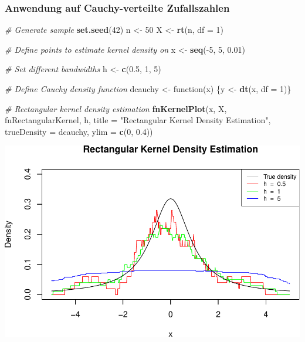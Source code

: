 \documentclass[10pt,]{article}
\newenvironment{Shaded}{\begin{snugshade}}{\end{snugshade}}
\newcommand{\KeywordTok}[1]{\textcolor[rgb]{0.13,0.29,0.53}{\textbf{{#1}}}}
\newcommand{\DataTypeTok}[1]{\textcolor[rgb]{0.13,0.29,0.53}{{#1}}}
\newcommand{\DecValTok}[1]{\textcolor[rgb]{0.00,0.00,0.81}{{#1}}}
\newcommand{\FloatTok}[1]{\textcolor[rgb]{0.00,0.00,0.81}{{#1}}}
\newcommand{\StringTok}[1]{\textcolor[rgb]{0.31,0.60,0.02}{{#1}}}
\newcommand{\CommentTok}[1]{\textcolor[rgb]{0.56,0.35,0.01}{\textit{{#1}}}}
\newcommand{\NormalTok}[1]{{#1}}
\begin{document}
\subsubsection{Anwendung auf Cauchy-verteilte
Zufallszahlen}\label{anwendung-auf-cauchy-verteilte-zufallszahlen}

\begin{Shaded}
\begin{Highlighting}[]
\CommentTok{# Generate sample}
\KeywordTok{set.seed}\NormalTok{(}\DecValTok{42}\NormalTok{)}
\NormalTok{n <-}\StringTok{ }\DecValTok{50}
\NormalTok{X <-}\StringTok{ }\KeywordTok{rt}\NormalTok{(n, }\DataTypeTok{df =} \DecValTok{1}\NormalTok{)}

\CommentTok{# Define points to estimate kernel density on}
\NormalTok{x <-}\StringTok{ }\KeywordTok{seq}\NormalTok{(-}\DecValTok{5}\NormalTok{, }\DecValTok{5}\NormalTok{, }\FloatTok{0.01}\NormalTok{)}

\CommentTok{# Set different bandwidths}
\NormalTok{h <-}\StringTok{ }\KeywordTok{c}\NormalTok{(}\FloatTok{0.5}\NormalTok{, }\DecValTok{1}\NormalTok{, }\DecValTok{5}\NormalTok{)}

\CommentTok{# Define Cauchy density function}
\NormalTok{dcauchy <-}\StringTok{ }\NormalTok{function(x) \{y <-}\StringTok{ }\KeywordTok{dt}\NormalTok{(x, }\DataTypeTok{df =} \DecValTok{1}\NormalTok{)\}}

\CommentTok{# Rectangular kernel density estimation}
\KeywordTok{fnKernelPlot}\NormalTok{(x, X, fnRectangularKernel, h, }
             \DataTypeTok{title =} \StringTok{"Rectangular Kernel Density Estimation"}\NormalTok{,}
             \DataTypeTok{trueDensity =} \NormalTok{dcauchy, }\DataTypeTok{ylim =} \KeywordTok{c}\NormalTok{(}\DecValTok{0}\NormalTok{, }\FloatTok{0.4}\NormalTok{))}
\end{Highlighting}
\end{Shaded}

\includegraphics{project2_files/figure-latex/Kernel density estimation for Cauchy-1.pdf}
\end{document}
